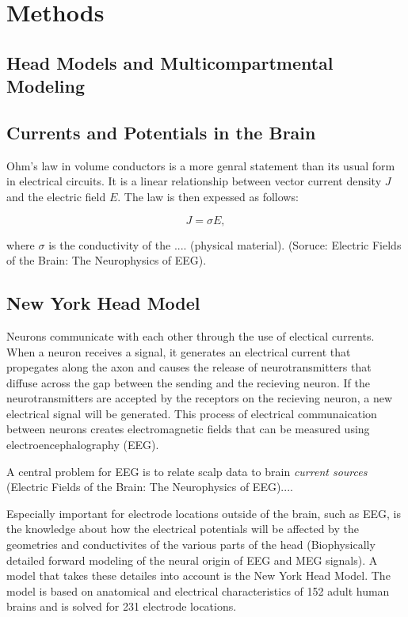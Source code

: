 \documentclass[a4paper, UKenglish, 11pt]{uiomaster}
\begin{document}
\chapter{Methods}

\section{Head Models and Multicompartmental Modeling }

\section{Currents and Potentials in the Brain}
Ohm's law in volume conductors is a more genral statement than its usual form in electrical circuits. It is a linear relationship between vector current density $J$ and the electric field $E$. The law is then expessed as follows:

\begin{equation}
J = \sigma E,
\label{eq:ohms_law}
\end{equation}

where $\sigma$ is the conductivity of the .... (physical material). (Soruce: Electric Fields of the Brain: The Neurophysics of EEG).


\section{New York Head Model}
Neurons communicate with each other through the use of electical currents. When a neuron receives a signal, it generates an electrical current that propegates along the axon and causes the release of neurotransmitters that diffuse across the gap between the sending and the recieving neuron. If the neurotransmitters are accepted by the receptors on the recieving neuron, a new electrical signal will be generated. This process of electrical communaication between neurons creates electromagnetic fields that can be measured using electroencephalography (EEG).

A central problem for EEG is to relate scalp data to brain \emph{current sources} (Electric Fields of the Brain: The Neurophysics of EEG)....

Especially important for electrode locations outside of the brain, such as EEG, is the knowledge about how the electrical potentials will be affected by the geometries and conductivites of the various parts of the head (Biophysically detailed forward modeling of the neural origin of EEG and MEG signals). A model that takes these detailes into account is the New York Head Model. The model is based on anatomical and electrical characteristics of 152 adult human brains and is solved for 231 electrode locations.
\end{document}

